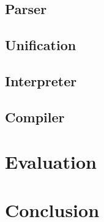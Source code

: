 \documentclass[12pt]{article}
\begin{document}

\subsection{Parser}

\subsection{Unification}

\subsection{Interpreter}

\subsection{Compiler}



\newpage

\section{Evaluation}






\newpage

\section{Conclusion}
\end{document}
